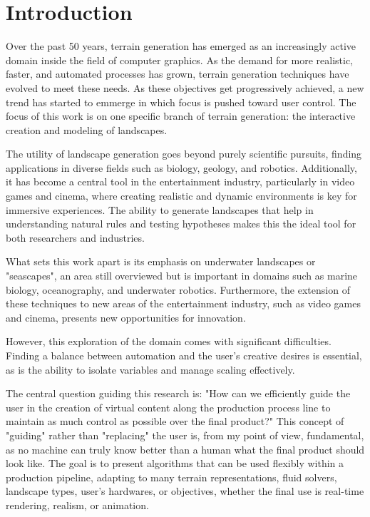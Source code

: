 \chapter{Introduction}
\label{chap:introduction}

Over the past 50 years, terrain generation has emerged as an increasingly active domain inside the field of computer graphics. As the demand for more realistic, faster, and automated processes has grown, terrain generation techniques have evolved to meet these needs. As these objectives get progressively achieved, a new trend has started to emmerge in which focus is pushed toward user control. The focus of this work is on one specific branch of terrain generation: the interactive creation and modeling of landscapes.

The utility of landscape generation goes beyond purely scientific pursuits, finding applications in diverse fields such as biology, geology, and robotics. Additionally, it has become a central tool in the entertainment industry, particularly in video games and cinema, where creating realistic and dynamic environments is key for immersive experiences. The ability to generate landscapes that help in understanding natural rules and testing hypotheses makes this the ideal tool for both researchers and industries.

What sets this work apart is its emphasis on underwater landscapes or "seascapes", an area still overviewed but is important in domains such as marine biology, oceanography, and underwater robotics. Furthermore, the extension of these techniques to new areas of the entertainment industry, such as video games and cinema, presents new opportunities for innovation.

However, this exploration of the domain comes with significant difficulties. Finding a balance between automation and the user's creative desires is essential, as is the ability to isolate variables and manage scaling effectively. 

The central question guiding this research is: "How can we efficiently guide the user in the creation of virtual content along the production process line to maintain as much control as possible over the final product?" This concept of "guiding" rather than "replacing" the user is, from my point of view, fundamental, as no machine can truly know better than a human what the final product should look like. The goal is to present algorithms that can be used flexibly within a production pipeline, adapting to many terrain representations, fluid solvers, landscape types, user's hardwares, or objectives, whether the final use is real-time rendering, realism, or animation.

